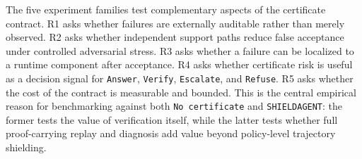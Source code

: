 The five experiment families test complementary aspects of the certificate contract. R1 asks whether
failures are externally auditable rather than merely observed. R2 asks whether independent support
paths reduce false acceptance under controlled adversarial stress. R3 asks whether a failure can be
localized to a runtime component after acceptance. R4 asks whether certificate risk is useful as a
decision signal for \texttt{Answer}, \texttt{Verify}, \texttt{Escalate}, and \texttt{Refuse}. R5
asks whether the cost of the contract is measurable and bounded. This is the central empirical
reason for benchmarking against both \texttt{No certificate} and \texttt{SHIELDAGENT}: the former
tests the value of verification itself, while the latter tests whether full proof-carrying replay and
diagnosis add value beyond policy-level trajectory shielding.


\usepackage{booktabs}
\usepackage{longtable}
\usepackage{array}
